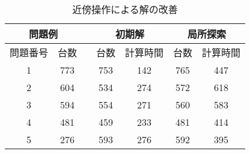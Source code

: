 \begin{table}[htbp]
    \centering
    \caption{近傍操作による解の改善}
    \label{review-local}
    \begin{tabular}{ccccccc}
    \hline
    \multicolumn{2}{c}{問題例}                               & \multicolumn{1}{l}{} & \multicolumn{2}{c}{初期解}                           & \multicolumn{2}{c}{局所探索}                          \\
    \hline
    \multicolumn{1}{l}{問題番号} & \multicolumn{1}{l}{台数} & \multicolumn{1}{l}{} & \multicolumn{1}{l}{台数} & \multicolumn{1}{l}{計算時間} & \multicolumn{1}{l}{台数} & \multicolumn{1}{l}{計算時間} \\
    \hline
    1                        & 773                        &                      & 753                    & 142                      & 765                    & 447                      \\
    2                        & 604                        &                      & 534                    & 274                      & 572                    & 618                      \\
    3                        & 594                        &                      & 554                    & 271                      & 560                    & 583                      \\
    4                        & 481                        &                      & 459                    & 233                      & 481                    & 414                      \\
    5                        & 276                        &                      & 593                    & 276                      & 592                    & 395                     \\
    \hline
    \end{tabular}
    \end{table}
